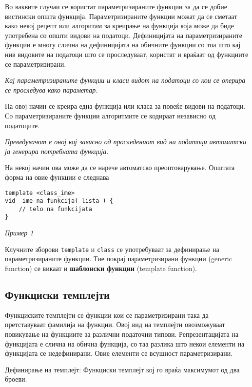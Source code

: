

Во ваквите случаи се користат параметризираните функции за да се добие вистински
општа функција. Параметризираните функции можат да се сметаат како некој рецепт
или алгоритам за креирање на функција која може да биде употребена со општи
видови на податоци. Дефиницијата на параметризираните функции е многу слична на
дефиницијата на обичните функции со тоа што кај нив видовите на податоци што се
проследуваат, користат и враќаат од функциите се параметризирани. 

\emph{Кај параметризираните функции и класи видот на податоци со кои се оперира
се проследува како параметар.}

На овој начин се креира една функција или класа за
повеќе видови на податоци. Со параметризираните функции алгоритмите се кодираат
независно од податоците. 

\emph{Преведувачот е оној кој зависно од проследениот вид на податоци автоматски ја
генерира потребната функција.}

 На некој начин ова може да се нарече автоматско преоптоварување. Општата форма
 на овие функции е следнава
 
\begin{lstlisting}
template <class_ime>    
vid  ime_na funkcija( lista ) {
	// telo na funkcijata
}
\end{lstlisting}

\textsl{Пример 1}



Клучните зборови \texttt{template} и \texttt{class} се употребуваат за дефинирање на
параметризираните функции. Тие покрај параметризирани функции (generic function)
се викаат и \textbf{шаблонски функции} (template function).

\subsection{Функциски темплејти}

Функциските темплејти се функции кои се параметризирани така да претставуваат
фамилија на функции. Овој вид на темплејти овозможуваат повикување на функциите
за различни податочни типови. Репрезентацијата на функцијата е слична на обична
функција, со таа разлика што некои елементи на функцијата се недефинирани. Овие
елементи се всушност параметризирани. 

Дефинирање на темплејт: Функциски темплејт кој го враќа максимумот од два
броеви.

